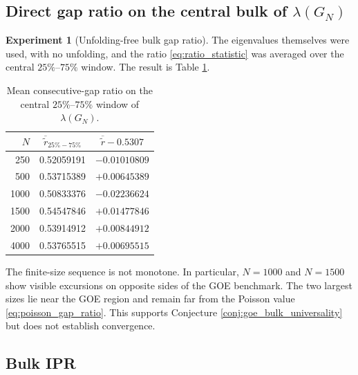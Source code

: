 \documentclass[11pt]{amsart}
\numberwithin{equation}{section}
\theoremstyle{plain}
\theoremstyle{definition}
\newtheorem{experiment}[theorem]{Experiment}
\theoremstyle{remark}
\begin{document}
\subsection{Direct gap ratio on the central bulk of $\lambda(G_N)$}
\label{subsec:direct_bulk_ratio}

\begin{experiment}[Unfolding-free bulk gap ratio]
\label{exp:bulk_gap_ratio}
The eigenvalues themselves were used, with no unfolding, and the ratio \eqref{eq:ratio_statistic} was averaged over the central $25\%$--$75\%$ window.  The result is Table \ref{tab:bulk_ratio}.

\begin{table}[htbp]
\centering
\caption{Mean consecutive-gap ratio on the central $25\%$--$75\%$ window of $\lambda(G_N)$.}
\label{tab:bulk_ratio}
\begin{tabular}{rcc}
\toprule
$N$ & $\overline{\widetilde r}_{25\%-75\%}$ & $\overline{\widetilde r}-0.5307$\\
\midrule
250  & 0.52059191 & $-0.01010809$\\
500  & 0.53715389 & $+0.00645389$\\
1000 & 0.50833376 & $-0.02236624$\\
1500 & 0.54547846 & $+0.01477846$\\
2000 & 0.53914912 & $+0.00844912$\\
4000 & 0.53765515 & $+0.00695515$\\
\bottomrule
\end{tabular}
\end{table}

The finite-size sequence is not monotone.  In particular, $N=1000$ and $N=1500$ show visible excursions on opposite sides of the GOE benchmark.  The two largest sizes lie near the GOE region and remain far from the Poisson value \eqref{eq:poisson_gap_ratio}.  This supports Conjecture \ref{conj:goe_bulk_universality} but does not establish convergence.
\end{experiment}

\subsection{Bulk IPR}
\label{subsec:bulk_ipr_data}
\end{document}
